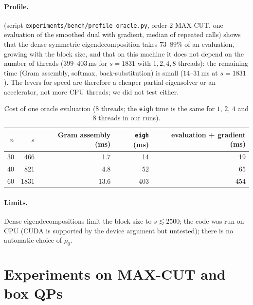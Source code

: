\documentclass[a4paper,11pt]{article}
\theoremstyle{plain}
\theoremstyle{definition}
\theoremstyle{remark}
\begin{document}
\paragraph{Profile.}  (script \texttt{experiments/bench/profile\_oracle.py}, order-$2$ MAX-CUT, one evaluation of the smoothed dual with gradient, median of repeated calls) shows that the dense symmetric eigendecomposition takes $73$--$89\%$ of an evaluation, growing with the block size, and that on this machine it does not depend on the number of threads ($399$--$403$\,ms for $s=1831$ with $1,2,4,8$ threads): the remaining time (Gram assembly, softmax, back-substitution) is small ($14$--$31$\,ms at $s=1831$). The levers for speed are therefore a cheaper partial eigensolver or an accelerator, not more CPU threads; we did not test either.
\begin{table}[t]\centering\small
\begin{tabular}{r r r r r}\toprule
$n$ & $s$ & Gram assembly (ms) & \texttt{eigh} (ms) & evaluation + gradient (ms)\\\midrule
30 & 466 & 1.7 & 14 & 19\\
40 & 821 & 4.8 & 52 & 65\\
60 & 1831 & 13.6 & 403 & 454\\
\bottomrule\end{tabular}
\caption{Cost of one oracle evaluation (8 threads; the \texttt{eigh} time is the same for $1$, $2$, $4$ and $8$ threads in our runs).}\label{tab:profile}
\end{table}
\paragraph{Limits.} Dense eigendecompositions limit the block size to $s\lesssim2500$; the code was run on CPU (CUDA is supported by the device argument but untested); there is no automatic choice of $\rho_0$.

\section{Experiments on MAX-CUT and box QPs}\label{sec:exp}
\end{document}

